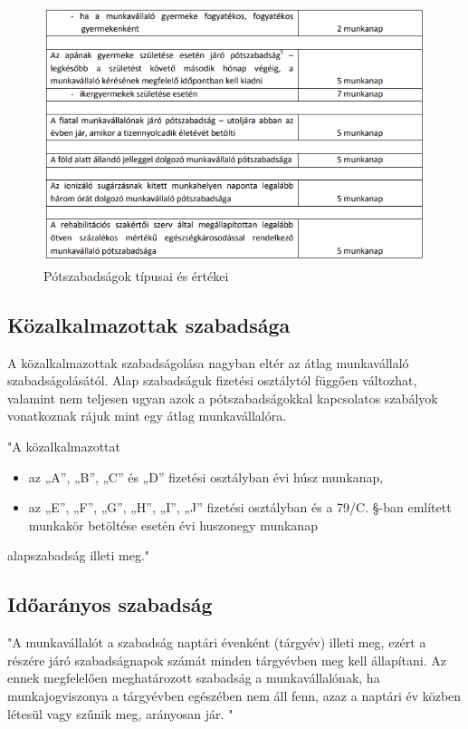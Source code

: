 \begin{figure}[h]
	\centering
	\includegraphics[scale= 0.8]{images/potszabadsagok_2.png}
	\caption{Pótszabadságok típusai és értékei}
	\label{fig:potszab2}
\end{figure}

\subsection{Közalkalmazottak szabadsága}

A közalkalmazottak szabadságolása nagyban eltér az átlag munkavállaló szabadságolásától. Alap szabadságuk fizetési osztálytól függően változhat, valamint nem teljesen ugyan azok a pótszabadságokkal kapcsolatos szabályok vonatkoznak rájuk mint egy átlag munkavállalóra.

"A közalkalmazottat
\begin{itemize}
	\item az „A”, „B”, „C” és „D” fizetési osztályban évi húsz munkanap,
	\item az „E”, „F”, „G”, „H”, „I”, „J” fizetési osztályban és a 79/C. §-ban említett munkakör betöltése esetén évi huszonegy munkanap
\end{itemize}

alapszabadság illeti meg."\cite{kozalkalmazottiSzabadsag}

\subsection{Időarányos szabadság}

"A munkavállalót a szabadság naptári évenként (tárgyév) illeti meg, ezért a részére járó szabadságnapok számát minden tárgyévben meg kell állapítani. Az ennek megfelelően meghatározott szabadság a munkavállalónak, ha munkajogviszonya a tárgyévben egészében nem áll fenn, azaz a naptári év közben létesül vagy szűnik meg, arányosan jár. " \cite{idoaranyosszabadsag}

